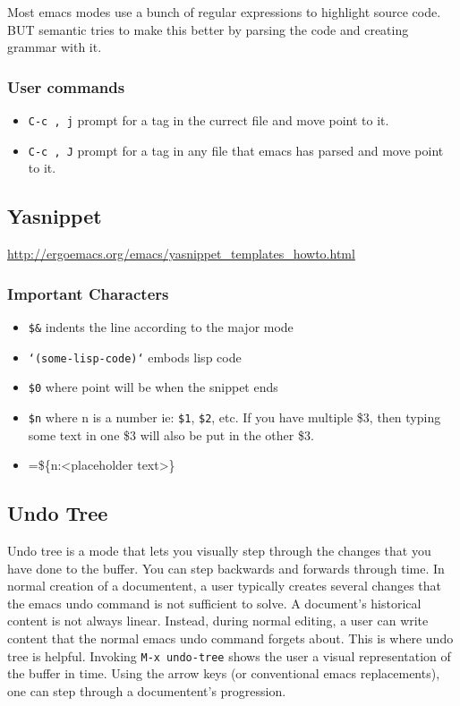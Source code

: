 \documentclass[11pt]{article}
\begin{document}
Most emacs modes use a bunch of regular expressions to highlight source code. BUT semantic tries to make this better by
parsing the code and creating grammar with it.
\subsubsection{User commands}
\label{sec:orgheadline25}
\begin{itemize}
\item \texttt{C-c , j} prompt for a tag in the currect file and move point to it.
\item \texttt{C-c , J} prompt for a tag in any file that emacs has parsed and move point to it.
\end{itemize}
\subsection{Yasnippet}
\label{sec:orgheadline28}
\url{http://ergoemacs.org/emacs/yasnippet_templates_howto.html}
\subsubsection{Important Characters}
\label{sec:orgheadline27}
\begin{itemize}
\item \texttt{\$\&} indents the line according to the major mode
\item \texttt{`(some-lisp-code)`} embods lisp code
\item \texttt{\$0} where point will be when the snippet ends
\item \texttt{\$n} where n is a number ie: \texttt{\$1}, \texttt{\$2}, etc.  If you have multiple \$3, then typing some text in one \$3 will also be put in
the other \$3.
\item =\$\{n:<placeholder text>\}
\end{itemize}
\subsection{Undo Tree}
\label{sec:orgheadline29}
Undo tree is a mode that lets you visually step through the changes that you have done to the buffer.  You can step backwards and forwards through time.  In normal creation of a documentent, a user typically creates several changes that the emacs undo command is not sufficient to solve.  A document's historical content is not always linear.  Instead, during normal editing, a user can write content that the normal emacs undo command forgets about.  This is where undo tree is helpful.  Invoking \texttt{M-x undo-tree} shows the user a visual representation of the buffer in time.  Using the arrow keys (or conventional emacs replacements), one can step through a documentent's progression.
\end{document}
